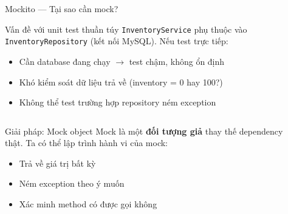 \documentclass[aspectratio=169,12pt]{beamer}
\begin{document}
\begin{frame}[fragile,shrink=18]{Mockito --- Tại sao cần mock?}
  \begin{block}{Vấn đề với unit test thuần túy}
    \texttt{InventoryService} phụ thuộc vào \texttt{InventoryRepository}
    (kết nối MySQL). Nếu test trực tiếp:
    \begin{itemize}
      \item Cần database đang chạy $\to$ test chậm, không ổn định
      \item Khó kiểm soát dữ liệu trả về (inventory = 0 hay 100?)
      \item Không thể test trường hợp repository ném exception
    \end{itemize}
  \end{block}

  \vspace{0.4em}
  \begin{columns}
    \begin{block}{Giải pháp: Mock object}
      Mock là một \textbf{đối tượng giả} thay thế dependency thật.
      Ta có thể lập trình hành vi của mock:
      \begin{itemize}
        \item Trả về giá trị bất kỳ
        \item Ném exception theo ý muốn
        \item Xác minh method có được gọi không
      \end{itemize}
    \end{block}

    \begin{center}
    \end{center}
  \end{columns}
\end{frame}
\end{document}
